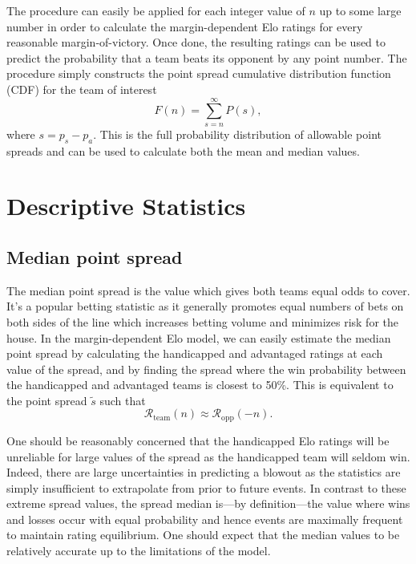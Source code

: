 \documentclass[aps,prc,reprint,amsmath,superscriptaddress]{revtex4-1}
\newcommand{\R}{\mathcal{R}}
\begin{document}
The procedure can easily be applied for each integer value of $n$ up to some large number in order to calculate the margin-dependent Elo ratings for every reasonable margin-of-victory.
Once done, the resulting ratings can be used to predict the probability that a team beats its opponent by any point number.
The procedure simply constructs the point spread cumulative distribution function (CDF) for the team of interest
\begin{equation}
  \label{cdf}
  F(n) = \sum_{s=n}^\infty P(s),
\end{equation}
where $s = p_s - p_a$.
This is the full probability distribution of allowable point spreads and can be used to calculate both the mean and median values.

\section{Descriptive Statistics}

\subsection{Median point spread}

The median point spread is the value which gives both teams equal odds to cover.
It's a popular betting statistic as it generally promotes equal numbers of bets on both sides of the line which increases betting volume and minimizes risk for the house.
In the margin-dependent Elo model, we can easily estimate the median point spread by calculating the handicapped and advantaged ratings at each value of the spread, and by finding the spread where the win probability between the handicapped and advantaged teams is closest to 50\%.
This is equivalent to the point spread $\tilde{s}$ such that
\begin{equation}
  \R_\text{team}(n) \approx \R_\text{opp}(-n).
\end{equation}

One should be reasonably concerned that the handicapped Elo ratings will be unreliable for large values of the spread as the handicapped team will seldom win.
Indeed, there are large uncertainties in predicting a blowout as the statistics are simply insufficient to extrapolate from prior to future events.
In contrast to these extreme spread values, the spread median is---by definition---the value where wins and losses occur with equal probability and hence events are maximally frequent to maintain rating equilibrium.
One should expect that the median values to be relatively accurate up to the limitations of the model.
\end{document}
